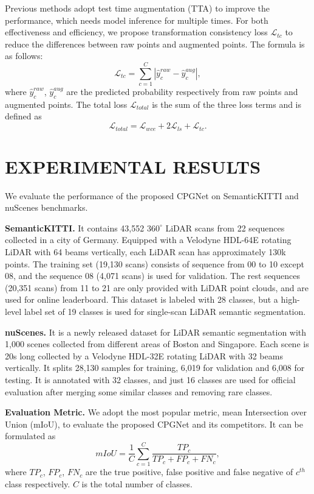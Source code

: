 \documentclass[letterpaper, 10 pt, conference]{ieeeconf}
\begin{document}
Previous methods \cite{tang2020searching, zhu2021cylindrical} adopt test time augmentation (TTA) to improve the performance, which needs model inference for multiple times. For both effectiveness and efficiency, we propose transformation consistency loss $\mathcal{L}_{tc}$ to reduce the differences between raw points and augmented points. The formula is as follows:
\begin{equation}
\mathcal{L}_{tc}=\sum_{c=1}^{C}|\hat{y}_c^{raw} - \hat{y}_c^{aug}|,
\end{equation}
where $\hat{y}_c^{raw}$, $\hat{y}_c^{aug}$ are the predicted probability respectively from raw points and augmented points. The total loss $\mathcal{L}_{total}$ is the sum of the three loss terms and is defined as
\begin{equation}
\mathcal{L}_{total}=\mathcal{L}_{wce} + 2\mathcal{L}_{ls} + \mathcal{L}_{tc}.
\end{equation}

\section{EXPERIMENTAL RESULTS}
We evaluate the performance of the proposed CPGNet on SemanticKITTI \cite{behley2019semantickitti} and nuScenes \cite{caesar2020nuscenes} benchmarks.

{\bf SemanticKITTI.} It contains 43,552 $360^\circ$ LiDAR scans from 22 sequences collected in a city of Germany. Equipped with a Velodyne HDL-64E rotating LiDAR with 64 beams vertically, each LiDAR scan has approximately 130k points. The training set (19,130 scans) consists of sequence from 00 to 10 except 08, and the sequence 08 (4,071 scans) is used for validation. The rest sequences (20,351 scans) from 11 to 21 are only provided with LiDAR point clouds, and are used for online leaderboard. This dataset is labeled with 28 classes, but a high-level label set of 19 classes is used for single-scan LiDAR semantic segmentation.

{\bf nuScenes.} It is a newly released dataset for LiDAR semantic segmentation with 1,000 scenes collected from different areas of Boston and Singapore. Each scene is 20s long collected by a Velodyne HDL-32E rotating LiDAR with 32 beams vertically. It splits 28,130 samples for training, 6,019 for validation and 6,008 for testing. It is annotated with 32 classes, and just 16 classes are used for official evaluation after merging some similar classes and removing rare classes.

{\bf Evaluation Metric.} We adopt the most popular metric, mean Intersection over Union (mIoU), to evaluate the proposed CPGNet and its competitors. It can be formulated as
\begin{equation}
mIoU = \frac{1}{C}\sum_{c=1}^{C}\frac{TP_{c}}{TP_{c} + FP_{c} + FN_{c}},
\end{equation}
where $TP_{c}$, $FP_{c}$, $FN_{c}$ are the true positive, false positive and false negative of $c^{th}$ class respectively. $C$ is the total number of classes.
\end{document}
